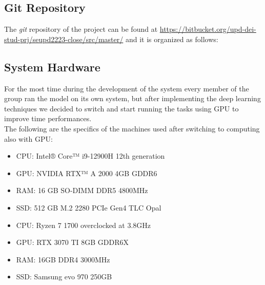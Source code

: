 \subsection{Git Repository}
The \textit{git} repository of the project can be found at
\url{https://bitbucket.org/upd-dei-stud-prj/seupd2223-close/src/master/} and it is organized as follows:


\subsection{System Hardware}
For the most time during the development of the system every member of the group ran the model on its own system, but after implementing the deep learning techniques we decided to switch and start running the tasks using GPU to improve time performances. \\
The following are the specifics of the machines used after switching to computing also with GPU:
\begin{itemize}
	\item CPU: Intel® Core™ i9-12900H 12th generation
	\item GPU: NVIDIA RTX™ A 2000 4GB GDDR6
	\item RAM: 16 GB SO-DIMM DDR5 4800MHz
	\item SSD: 512 GB M.2 2280 PCIe Gen4 TLC Opal
\end{itemize}
\begin{itemize}
	\item CPU: Ryzen 7 1700 overclocked at 3.8GHz
	\item GPU: RTX 3070 TI 8GB GDDR6X
	\item RAM: 16GB  DDR4 3000MHz
	\item SSD: Samsung evo 970 250GB
\end{itemize}


